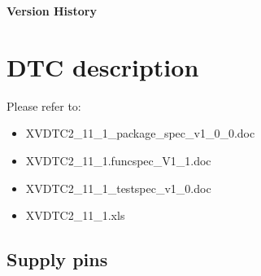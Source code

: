 









\newpage
\raggedright
\Large {\bf Version History}
\normalsize

\newpage
\raggedright
\tableofcontents
\newpage
\pagestyle{fancy}

\chapter{DTC description}

Please refer to:
\begin{itemize}
\item XVDTC2\_11\_1\_package\_spec\_v1\_0\_0.doc
\item XVDTC2\_11\_1.funcspec\_V1\_1.doc
\item XVDTC2\_11\_1\_testspec\_v1\_0.doc
\item XVDTC2\_11\_1.xls
\end{itemize}

\jj
\newpage
\section{Supply pins}


